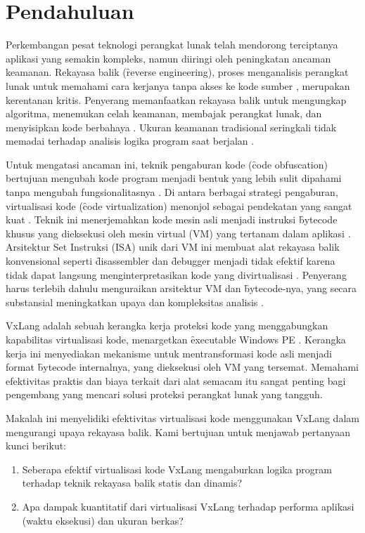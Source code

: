 \section{Pendahuluan}
Perkembangan pesat teknologi perangkat lunak telah mendorong terciptanya aplikasi yang semakin kompleks, namun diiringi oleh peningkatan ancaman keamanan. Rekayasa balik (\f{reverse engineering}), proses menganalisis perangkat lunak untuk memahami cara kerjanya tanpa akses ke kode sumber \cite{Has18}, merupakan kerentanan kritis. Penyerang memanfaatkan rekayasa balik untuk mengungkap algoritma, menemukan celah keamanan, membajak perangkat lunak, dan menyisipkan kode berbahaya \cite{Wak24}. Ukuran keamanan tradisional seringkali tidak memadai terhadap analisis logika program saat berjalan \cite{Sec19}.

Untuk mengatasi ancaman ini, teknik pengaburan kode (\f{code obfuscation}) bertujuan mengubah kode program menjadi bentuk yang lebih sulit dipahami tanpa mengubah fungsionalitasnya \cite{Jin24}. Di antara berbagai strategi pengaburan, virtualisasi kode (\f{code virtualization}) menonjol sebagai pendekatan yang sangat kuat \cite{Ore06, Zho24}. Teknik ini menerjemahkan kode mesin asli menjadi instruksi \f{bytecode} khusus yang dieksekusi oleh mesin virtual (VM) yang tertanam dalam aplikasi \cite{Don20}. Arsitektur Set Instruksi (ISA) unik dari VM ini membuat alat rekayasa balik konvensional seperti \f{disassembler} dan \f{debugger} menjadi tidak efektif karena tidak dapat langsung menginterpretasikan kode yang divirtualisasi \cite{Salwan2018SymbolicDeobfuscation}. Penyerang harus terlebih dahulu menguraikan arsitektur VM dan \f{bytecode}-nya, yang secara substansial meningkatkan upaya dan kompleksitas analisis \cite{Hac24}.

VxLang adalah sebuah kerangka kerja proteksi kode yang menggabungkan kapabilitas virtualisasi kode, menargetkan \f{executable} Windows PE \cite{VxLang}. Kerangka kerja ini menyediakan mekanisme untuk mentransformasi kode asli menjadi format \f{bytecode} internalnya, yang dieksekusi oleh VM yang tersemat. Memahami efektivitas praktis dan biaya terkait dari alat semacam itu sangat penting bagi pengembang yang mencari solusi proteksi perangkat lunak yang tangguh.

Makalah ini menyelidiki efektivitas virtualisasi kode menggunakan VxLang dalam mengurangi upaya rekayasa balik. Kami bertujuan untuk menjawab pertanyaan kunci berikut:
\begin{enumerate}
    \item Seberapa efektif virtualisasi kode VxLang mengaburkan logika program terhadap teknik rekayasa balik statis dan dinamis?
    \item Apa dampak kuantitatif dari virtualisasi VxLang terhadap performa aplikasi (waktu eksekusi) dan ukuran berkas?
\end{enumerate}

